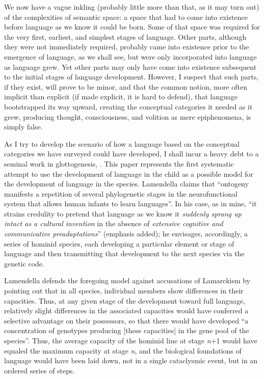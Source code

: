 
We now have a vague inkling (probably little more than that, as it may turn out) of the complexities of semantic space: a space that had to come into existence before language as we know it could be born. Some of that space was required for the very first, earliest, and simplest stages of language. Other parts, although they were not
immediately required, probably came into existence prior to the emergence of language, as we shall see, but were only incorporated into language as language grew. Yet other parts may only have come into existence subsequent to the initial stages of language development. However, I suspect that such parts, if they exist, will prove to be minor, and that the common notion, more often implicit than explicit (if made explicit, it is hard to defend), that language bootstrapped its way upward, creating the conceptual categories it needed as it grew, producing thought, consciousness, and volition as mere epiphenomena, is simply false.

As I try to develop the scenario of how a language based on the conceptual categories we have surveyed could have developed, I shall incur a heavy debt to a seminal work in glottogenesis, \citet{Lamendella1976}. This paper represents the first systematic attempt to use the development of language in the child as a possible model for the development of language in the species. Lamendella claims that ``ontogeny manifests a repetition of several phylogenetic stages in the neurofunctional system that allows human infants to learn languages''. In his case, as in mine, ``it strains credulity to pretend that language as we know it \textit{suddenly sprang up intact as a cultural invention} in the absence of \textit{extensive cognitive and communicative preadaptations}'' (emphasis added); he envisages, accordingly, a series of hominid species, each developing a particular element or stage of language and then transmitting that development to the next species via the genetic code. 

Lamendella defends the foregoing model against accusations of Lamarckism by pointing out that in all species, individual members show differences in their capacities. Thus, at any given stage of the development toward full language, relatively slight differences in the associated capacities would have conferred a selective advantage on their possessors, so that there would have developed ``a concentration of genotypes producing [these capacities] in the gene pool of the species''. Thus, the average capacity of the hominid line at stage \textit{n}+1 would have equaled the maximum capacity at stage \textit{n}, and the
biological foundations of language would have been laid down, not in a single cataclysmic event, but in an ordered series of steps.

